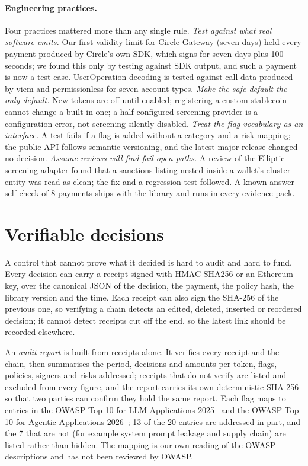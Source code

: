 \documentclass[11pt]{article}
\begin{document}
\paragraph{Engineering practices.} Four practices mattered more than any single rule.
\emph{Test against what real software emits.} Our first validity limit for Circle Gateway (seven days) held every payment produced by Circle's own SDK, which signs for seven days plus 100 seconds; we found this only by testing against SDK output, and such a payment is now a test case. UserOperation decoding is tested against call data produced by viem and permissionless for seven account types.
\emph{Make the safe default the only default.} New tokens are off until enabled; registering a custom stablecoin cannot change a built-in one; a half-configured screening provider is a configuration error, not screening silently disabled.
\emph{Treat the flag vocabulary as an interface.} A test fails if a flag is added without a category and a risk mapping; the public API follows semantic versioning, and the latest major release changed no decision.
\emph{Assume reviews will find fail-open paths.} A review of the Elliptic screening adapter found that a sanctions listing nested inside a wallet's cluster entity was read as clean; the fix and a regression test followed. A known-answer self-check of 8 payments ships with the library and runs in every evidence pack.

\section{Verifiable decisions}\label{sec:verifiable}

A control that cannot prove what it decided is hard to audit and hard to fund. Every decision can carry a receipt signed with HMAC-SHA256 or an Ethereum key, over the canonical JSON of the decision, the payment, the policy hash, the library version and the time. Each receipt can also sign the SHA-256 of the previous one, so verifying a chain detects an edited, deleted, inserted or reordered decision; it cannot detect receipts cut off the end, so the latest link should be recorded elsewhere.

An \emph{audit report} is built from receipts alone. It verifies every receipt and the chain, then summarises the period, decisions and amounts per token, flags, policies, signers and risks addressed; receipts that do not verify are listed and excluded from every figure, and the report carries its own deterministic SHA-256 so that two parties can confirm they hold the same report. Each flag maps to entries in the OWASP Top 10 for LLM Applications 2025~\cite{owaspllm} and the OWASP Top 10 for Agentic Applications 2026~\cite{owaspagentic}; 13 of the 20 entries are addressed in part, and the 7 that are not (for example system prompt leakage and supply chain) are listed rather than hidden. The mapping is our own reading of the OWASP descriptions and has not been reviewed by OWASP.
\end{document}
